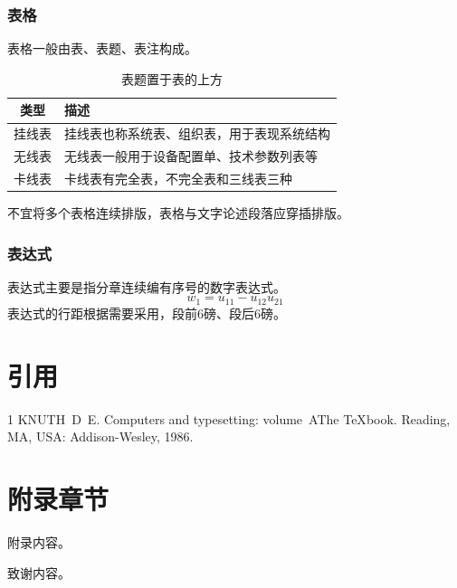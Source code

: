 \subsection{表格}

表格一般由表、表题、表注构成。

\begin{table}
  \centering
  \caption{表题置于表的上方}
  \label{tab:example}
  \begin{tabular}{cl}
    \toprule
    类型   & 描述                                       \\
    \midrule
    挂线表 & 挂线表也称系统表、组织表，用于表现系统结构 \\
    无线表 & 无线表一般用于设备配置单、技术参数列表等   \\
    卡线表 & 卡线表有完全表，不完全表和三线表三种       \\
    \bottomrule
  \end{tabular}
\end{table}

不宜将多个表格连续排版，表格与文字论述段落应穿插排版。

\clearpage

\subsection{表达式}

表达式主要是指分章连续编有序号的数字表达式。
\begin{equation}
  w_1 = u_{11} - u_{12} u_{21}
  \label{eq:example}
\end{equation}
表达式的行距根据需要采用，段前6磅、段后6磅。

\chapter{引用}
\cite{knuth86a}

\begin{thebibliography}{1}
KNUTH~D~E.
\newblock Computers and typesetting: volume~A\quad The
  {\TeX}book\allowbreak[M].
\newblock Reading, MA, USA: Addison-Wesley, 1986.
\end{thebibliography}

\appendix
\chapter{附录章节}
附录内容。

\backmatter
\begin{acknowledgments}
  致谢内容。
\end{acknowledgments}

